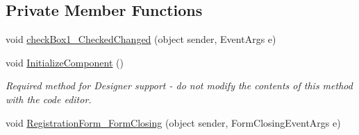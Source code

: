 \subsection*{Private Member Functions}
\begin{DoxyCompactItemize}
\item 
void \hyperlink{class__7___doroshenko__forms2__is52_1_1_registration_form_ab5089f0bb46579d23942b19d4bbcd542}{check\+Box1\+\_\+\+Checked\+Changed} (object sender, Event\+Args e)
\item 
void \hyperlink{class__7___doroshenko__forms2__is52_1_1_registration_form_a0fe750fb526e69ebe4b83165857d91bf}{Initialize\+Component} ()
\begin{DoxyCompactList}\small\item\em Required method for Designer support -\/ do not modify the contents of this method with the code editor. \end{DoxyCompactList}\item 
void \hyperlink{class__7___doroshenko__forms2__is52_1_1_registration_form_acbf3a620ac8cab4171de994132465912}{Registration\+Form\+\_\+\+Form\+Closing} (object sender, Form\+Closing\+Event\+Args e)
\end{DoxyCompactItemize}
